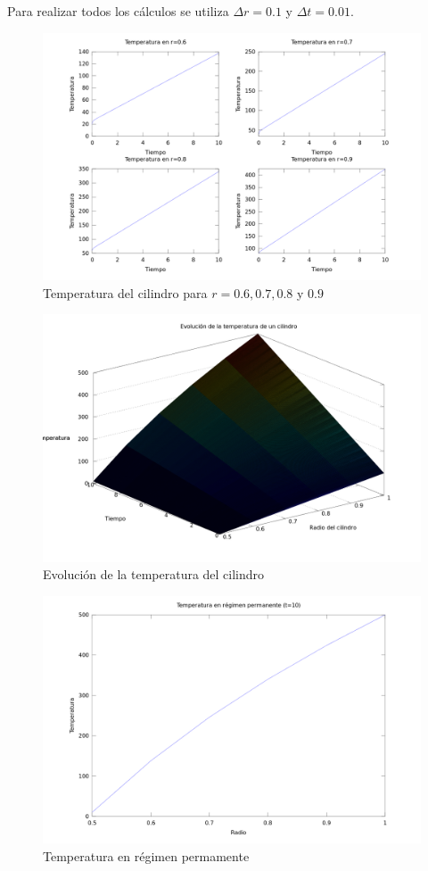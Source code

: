 \documentclass[journal, monochrome]{IEEEtran}
\begin{document}
Para realizar todos los cálculos se utiliza $\Delta r = 0.1$ y $\Delta t = 0.01$.


\begin{figure}[hbp]
	\centering
	\includegraphics[scale = 0.50]{img/graph_c.png}
	\caption{Temperatura del cilindro para $r = 0.6,0.7,0.8$ y $0.9$}
	\label{figure:histograms}
\end{figure}
\begin{figure}
	\centering
	\includegraphics[scale = 0.25]{img/graph_mesh.png}
	\caption{Evolución de la temperatura del cilindro}
	\label{figure:histograms}
\end{figure}
\begin{figure}
	\centering
	\includegraphics[scale = 0.25]{img/graph_d.png}
	\caption{Temperatura en régimen permamente}
	\label{figure:histograms}
\end{figure}
\end{document}
